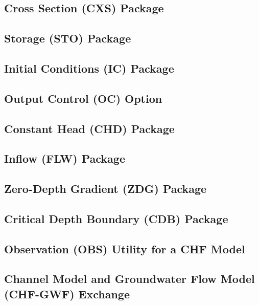 \newpage
\subsection{Cross Section (CXS) Package}


\newpage
\subsection{Storage (STO) Package}


\newpage
\subsection{Initial Conditions (IC) Package}


\newpage
\subsection{Output Control (OC) Option}


\newpage
\subsection{Constant Head (CHD) Package}


\newpage
\subsection{Inflow (FLW) Package}


\newpage
\subsection{Zero-Depth Gradient (ZDG) Package}


\newpage
\subsection{Critical Depth Boundary (CDB) Package}


\newpage
\subsection{Observation (OBS) Utility for a CHF Model}


\newpage
\subsection{Channel Model and Groundwater Flow Model (CHF-GWF) Exchange}



